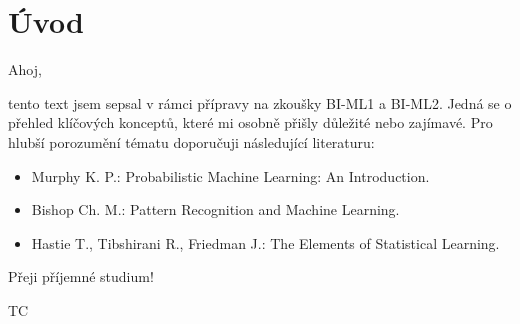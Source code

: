 \section{Úvod}

Ahoj,

tento text jsem sepsal v rámci přípravy na zkoušky BI-ML1 a BI-ML2. Jedná se o přehled klíčových konceptů, které mi osobně přišly důležité nebo zajímavé. Pro hlubší porozumění tématu doporučuji následující literaturu:
\begin{itemize}
    \item Murphy K. P.: Probabilistic Machine Learning: An Introduction.
    \item Bishop Ch. M.: Pattern Recognition and Machine Learning.
    \item Hastie T., Tibshirani R., Friedman J.: The Elements of Statistical Learning.
\end{itemize}

Přeji příjemné studium!

\begin{flushright}
    TC
\end{flushright}
